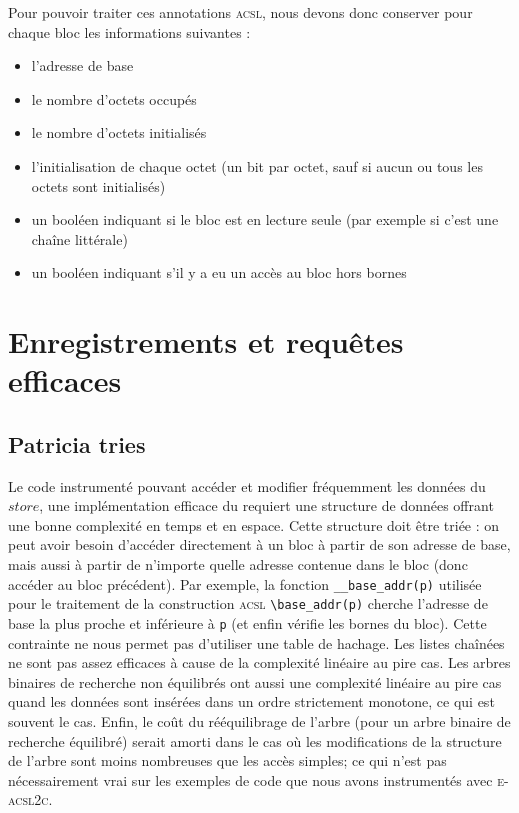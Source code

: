 \documentclass[french]{spimufcphdthesis}
\begin{document}
Pour pouvoir traiter ces annotations \textsc{acsl}, nous devons donc conserver
pour chaque bloc les informations suivantes :
\begin{itemize}
\item l'adresse de base
\item le nombre d'octets occupés
\item le nombre d'octets initialisés
\item l'initialisation de chaque octet (un bit par octet, sauf si aucun ou tous
  les octets sont initialisés)
\item un booléen indiquant si le bloc est en lecture seule (par exemple si c'est
  une chaîne littérale)
\item un booléen indiquant s'il y a eu un accès au bloc hors bornes
\end{itemize}




\section{Enregistrements et requêtes efficaces}


\subsection{Patricia tries}

Le code instrumenté pouvant accéder et modifier fréquemment les données du
$store$, une implémentation efficace du requiert une structure de données
offrant une bonne complexité en temps et en espace. Cette structure doit être
triée : on peut avoir besoin d'accéder directement à un bloc à partir de son
adresse de base, mais aussi à partir de n'importe quelle adresse contenue dans
le bloc (donc accéder au bloc précédent). Par exemple, la fonction
\lstinline{__base_addr(p)} utilisée pour le traitement de la construction
\textsc{acsl} \lstinline{\base_addr(p)} cherche l'adresse de base la plus
proche et inférieure à \lstinline{p} (et enfin vérifie les bornes du bloc).
Cette contrainte ne nous permet pas d'utiliser une table de hachage. Les listes
chaînées ne sont pas assez efficaces à cause de la complexité linéaire au pire
cas. Les arbres binaires de recherche non équilibrés ont aussi une complexité
linéaire au pire cas quand les données sont insérées dans un ordre strictement
monotone, ce qui est souvent le cas. Enfin, le coût du rééquilibrage de l'arbre
(pour un arbre binaire de recherche équilibré) serait amorti dans le cas où les
modifications de la structure de l'arbre sont moins nombreuses que les accès
simples; ce qui n'est pas nécessairement vrai sur les exemples de code que nous
avons instrumentés avec \textsc{e-acsl2c}.
\end{document}
